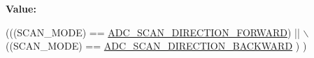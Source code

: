 {\bfseries Value\+:}
\begin{DoxyCode}
(((SCAN\_MODE) == \hyperlink{group___a_d_c___scan__mode_ga68fdaadb92f6293fc63cdeefd0c93a4f}{ADC\_SCAN\_DIRECTION\_FORWARD}) || \(\backslash\)
                                     ((SCAN\_MODE) == \hyperlink{group___a_d_c___scan__mode_gae160445e1a005fba64d739c321ae61b9}{ADC\_SCAN\_DIRECTION\_BACKWARD}
      )  )
\end{DoxyCode}
